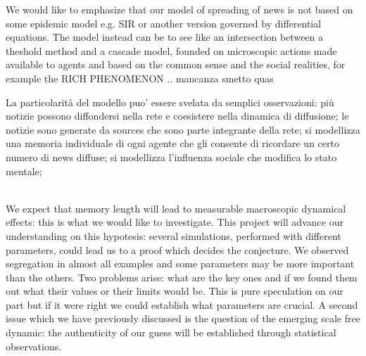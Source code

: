 We would like to emphasize that our model of spreading of news is not based on some epidemic model
 e.g. SIR or another version governed by differential equations. The model instead can be to see like an 
 intersection between a theshold method and a cascade model, founded on microscopic actions made available to agents 
  and based on the common sense and the social realities, for example the RICH PHENOMENON .. mancanza smetto quas


La particolarità del modello puo' essere svelata da semplici osservazioni: più notizie possono diffondersi nella rete e coesistere nella
 dinamica di diffusione; le notizie sono generate da sources che sono parte integrante della rete; si modellizza una memoria individuale
 di ogni agente che gli consente di ricordare un certo numero di news diffuse; si modellizza l'influenza sociale che modifica lo stato mentale;

 \\
 We expect that memory length will lead to measurable macroscopic
 dynamical effects: this is what we would like to investigate.
 This project will advance our understanding on this hypotesis:
 several simulations, performed with different parameters, could lead
 us to a proof which decides the conjecture.
 We observed segregation in almost all examples and some parameters may be
 more important than the others. Two problems arise: what are the key ones
 and if we found them out what their values or their limits would be.
 This is pure speculation on our part but if it were right we could
 establish what parameters are crucial.
 A second issue which we have previously discussed is the question of the
 emerging scale free dynamic: the authenticity of our guess will
 be established through statistical observations.
 
